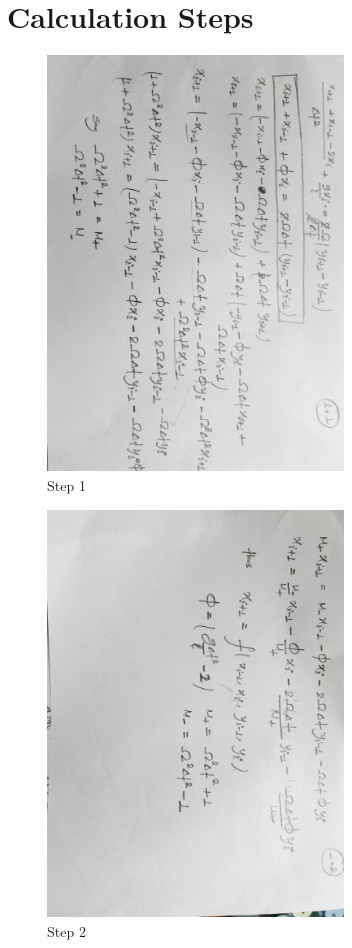 \documentclass[12pt,a4paper]{article}
\begin{document}
\section{Calculation Steps}

\begin{figure}[H]
    \centering
    \includegraphics[width=0.7\textwidth,angle=90]{calc1.jpeg}
    \caption{Step 1}
\end{figure}

\begin{figure}[H]
    \centering
    \includegraphics[width=0.7\textwidth,angle=90]{calc2.jpeg}
    \caption{Step 2}
\end{figure}
\end{document}
